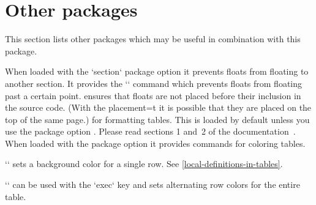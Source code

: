 
\section{Other packages}
\label{other-packages}

This section lists other packages which may be useful in combination with this package.

  When loaded with the `section` package option it prevents floats from floating to another section.
  It provides the `\FloatBarrier` command which prevents floats from floating past a certain point.
  ensures that floats are not placed before their inclusion in the source code.
  (With the placement=t it is possible that they are placed on the top of the same page.)
  for formatting tables.
  This is loaded by default unless you use the package option .
  Please read sections 1 and~2 of the  documentation~\autocite{booktabs}.
  When loaded with the package option  it provides commands for coloring tables.

  `` sets a background color for a single row. See \cref{local-definitions-in-tables}.

  `` can be used with the `exec` key and sets alternating row colors for the entire table.

